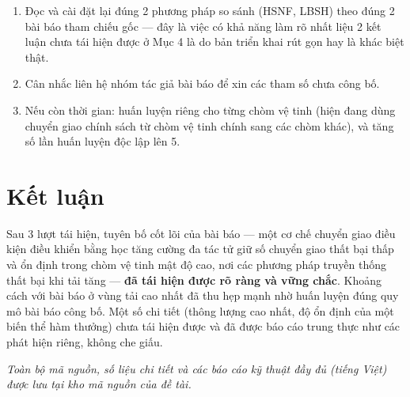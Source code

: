 \documentclass[12pt,a4paper]{article}
\begin{document}
\begin{enumerate}[leftmargin=1.2em]
  \item Đọc và cài đặt lại đúng 2 phương pháp so sánh (HSNF, LBSH) theo đúng 2 bài báo tham
        chiếu gốc — đây là việc có khả năng làm rõ nhất liệu 2 kết luận chưa tái hiện được ở
        Mục 4 là do bản triển khai rút gọn hay là khác biệt thật.
  \item Cân nhắc liên hệ nhóm tác giả bài báo để xin các tham số chưa công bố.
  \item Nếu còn thời gian: huấn luyện riêng cho từng chòm vệ tinh (hiện đang dùng chuyển giao
        chính sách từ chòm vệ tinh chính sang các chòm khác), và tăng số lần huấn luyện độc
        lập lên 5.
\end{enumerate}

\section{Kết luận}

Sau 3 lượt tái hiện, tuyên bố cốt lõi của bài báo — một cơ chế chuyển giao điều kiện điều
khiển bằng học tăng cường đa tác tử giữ số chuyển giao thất bại thấp và ổn định trong chòm vệ
tinh mật độ cao, nơi các phương pháp truyền thống thất bại khi tải tăng — \textbf{đã tái hiện
được rõ ràng và vững chắc}. Khoảng cách với bài báo ở vùng tải cao nhất đã thu hẹp mạnh nhờ
huấn luyện đúng quy mô bài báo công bố. Một số chi tiết (thông lượng cao nhất, độ ổn định của
một biến thể hàm thưởng) chưa tái hiện được và đã được báo cáo trung thực như các phát hiện
riêng, không che giấu.

\vspace{1em}
\noindent\emph{Toàn bộ mã nguồn, số liệu chi tiết và các báo cáo kỹ thuật đầy đủ (tiếng Việt)
được lưu tại kho mã nguồn của đề tài.}
\end{document}
